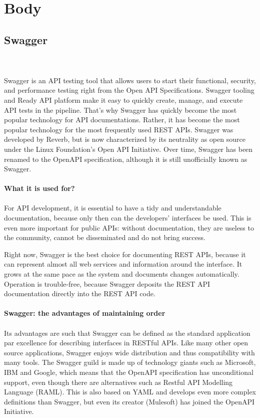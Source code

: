 \documentclass[twoside,twocolumn]{article}
\begin{document}

\section{Body}
\subsection{Swagger}
\\ \\
Swagger is an API testing tool that allows users to start their functional, security, and performance testing right from the Open API Specifications. Swagger tooling and Ready API platform make it easy to quickly create, manage, and execute API tests in the pipeline.
That's why Swagger has quickly become the most popular technology for API documentations. Rather, it has become the most popular technology for the most frequently used REST APIs. Swagger was developed by Reverb, but is now characterized by its neutrality as open source under the Linux Foundation's Open API Initiative. Over time, Swagger has been renamed to the OpenAPI specification, although it is still unofficially known as Swagger.
\\ \\

 \textbf{ What it is used for?}
\\ \\
For API development, it is essential to have a tidy and understandable documentation, because only then can the developers' interfaces be used. This is even more important for public APIs: without documentation, they are useless to the community, cannot be disseminated and do not bring success.

Right now, Swagger is the best choice for documenting REST APIs, because it can represent almost all web services and information around the interface. It grows at the same pace as the system and documents changes automatically. Operation is trouble-free, because Swagger deposits the REST API documentation directly into the REST API code.
\\ \\


 \textbf{ Swagger: the advantages of maintaining order}
\\ \\
Its advantages are such that Swagger can be defined as the standard application par excellence for describing interfaces in RESTful APIs. Like many other open source applications, Swagger enjoys wide distribution and thus compatibility with many tools. The Swagger guild is made up of technology giants such as Microsoft, IBM and Google, which means that the OpenAPI specification has unconditional support, even though there are alternatives such as Restful API Modelling Language (RAML). This is also based on YAML and develops even more complex definitions than Swagger, but even its creator (Mulesoft) has joined the OpenAPI Initiative.
\end{document}
